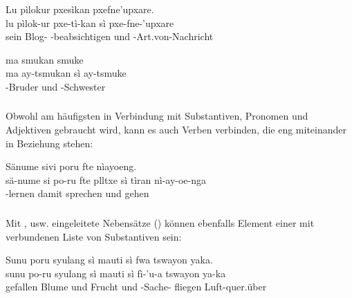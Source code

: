 \begin{interlin}
	\glll \Npawl{}Lu pìlokur pxesìkan  pxefne’upxare. \\
	lu pìlok-ur pxe-tì-kan sì pxe-fne-'upxare \\
	sein Blog- -beabsichtigen und -Art.von-Nachricht \\
\end{interlin}

\begin{interlin}
	\glll \Npawl{}ma smukan  smuke \\
	ma ay-tsmukan sì ay-tsmuke \\
	 -Bruder und -Schwester \\
\end{interlin}

\subsubsection{} Obwohl  am häufigsten in Verbindung mit Substantiven, Pronomen und Adjektiven gebraucht wird, kann es auch Verben verbinden, die eng miteinander in Beziehung stehen:

\begin{interlin}
	\glll \Nfilm{}Sänume sivi poru fte    nìayoeng. \\
	sä-nume si po-ru fte plltxe sì tìran nì-ay-oe-nga \\
	-lernen   damit sprechen und gehen  \\
\end{interlin}

\subsubsection{} Mit ,  usw. eingeleitete Nebensätze () können ebenfalls Element einer mit  verbundenen Liste von Substantiven sein: 

\begin{interlin}
	\glll \Npawl{}Sunu poru syulang sì mauti sì fwa tswayon yaka. \\
	sunu po-ru syulang sì mauti sì fì-'u-a tswayon ya-ka \\
	gefallen  Blume und Frucht und -Sache- fliegen Luft-quer.über \\
\end{interlin}

